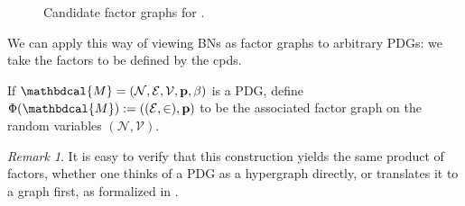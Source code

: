 \documentclass{article}
\theoremstyle{plain}
\theoremstyle{definition}
\theoremstyle{remark}
\newtheorem*{remark}{Remark}
\newcommand\mat[1]{\mathbf{#1}}
\newcommand{\V}{\mathcal V}
\newcommand{\N}{\mathcal N}
\newcommand{\Ed}{\mathcal E}
\newcommand{\pdgvars}[1][]{(\N#1, \Ed#1, \V#1, \mat p#1, \beta#1)}
\newcommand{\dg}[1]{\mathbdcal{#1}}
\numberwithin{equation}{section}
\begin{document}
{\begin{figure}[htb]
\begin{subfigure}[b]{0.3\linewidth}
{}
		\caption{}\label{subfig:fg-smoking}
	\end{subfigure}%
	\caption{Candidate factor graphs for .
	}
	\label{fig:fg-intro-examples}
\end{figure}

We can apply this way of viewing BNs as factor graphs to arbitrary
PDGs: we take the factors to be defined by the cpds.
\begin{defn}
	If $\dg M = \pdgvars[]$ is a PDG, define 
	$ \Phi(\dg M) := ((\Ed,\in), \mat p)$
	to be the associated factor graph on the random
			variables $(\N, \V)$. 
\end{defn}
\begin{remark}
	It is easy to verify that this construction yields the 
			same product of factors, whether one thinks of a PDG
			as a hypergraph directly, or translates it to a graph
			first, as formalized in . 
\end{remark}

}
\end{document}
